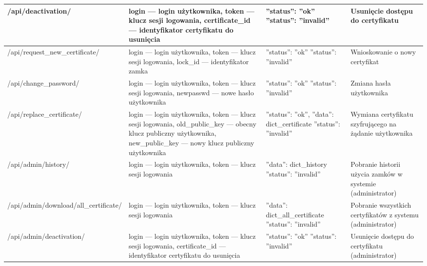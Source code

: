 \begin{landscape}
\begin{longtable}[!ht]{|m{5cm}|m{6.5cm}|m{5cm}|m{5.5cm}|}
		/api/deactivation/ & login --- login użytkownika, \newline token --- klucz sesji logowania, \newline certificate\_id --- identyfikator certyfikatu do usunięcia & ''status'': ''ok'' \tablinia ''status'': ''invalid'' & Usunięcie dostępu do certyfikatu \\ \hline
		/api/request\_new\_certificate/ & login --- login użytkownika, \newline token --- klucz sesji logowania, \newline lock\_id --- identyfikator zamka & ''status'': ''ok'' \tablinia ''status'': ''invalid'' & Wnioskowanie o nowy certyfikat \\ \hline
		/api/change\_password/ & login --- login użytkownika, \newline token --- klucz sesji logowania, \newline newpasswd --- nowe hasło użytkownika & ''status'': ''ok'' \tablinia ''status'': ''invalid'' & Zmiana hasła użytkownika \\ \hline
		/api/replace\_certificate/ & login --- login użytkownika, \newline token --- klucz sesji logowania, \newline old\_public\_key --- obecny klucz publiczny użytkownika, \newline new\_public\_key --- nowy klucz publiczny użytkownika & ''status'': ''ok'', \newline ''data'': dict\_certificate \tablinia ''status'': ''invalid'' & Wymiana certyfikatu szyfrującego na żądanie użytkownika \\ \hline
		/api/admin/history/ & login --- login użytkownika, \newline token --- klucz sesji logowania & ''data'': dict\_history \tablinia ''status'': ''invalid'' & Pobranie historii użycia zamków w systemie (administrator) \\ \hline
		/api/admin/download/\linebreak all\_certificate/ & login --- login użytkownika, \newline token --- klucz sesji logowania & ''data'': dict\_all\_certificate \tablinia ''status'': ''invalid'' & Pobranie wszystkich certyfikatów z systemu (administrator)\\ \hline
		/api/admin/deactivation/ & login --- login użytkownika, \newline token --- klucz sesji logowania, \newline certificate\_id --- identyfikator certyfikatu do usunięcia & ''status'': ''ok'' \tablinia ''status'': ''invalid'' & Usunięcie dostępu do certyfikatu (administrator) \\ \hline

\end{longtable}
\end{landscape}
